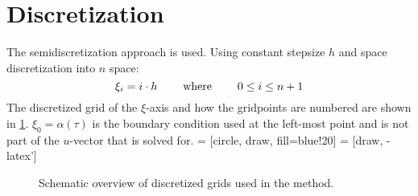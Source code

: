 \documentclass{article}
\begin{document}
\section{Discretization}

The semidiscretization approach is used. Using constant stepsize $h$ and space discretization into $n$ space:
\begin{equation}
    \xi_i = i \cdot h \hspace{0.8cm} \text{where}  \hspace{0.8cm} 0 \leq i \leq n+1 
\end{equation}
The discretized grid of the $\xi$-axis and how the gridpoints are numbered are
shown in \cref{discret}. $\xi_{0}=\alpha(\tau)$ is the boundary condition used at
the left-most point and is not part of the $u$-vector that is solved for. 
 = [circle, draw, fill=blue!20]
 = [draw, -latex']
\begin{figure}[!h]
  \centering
  \caption{Schematic overview of discretized grids used in the method.}
  \label{discret}
\end{figure}
\end{document}
